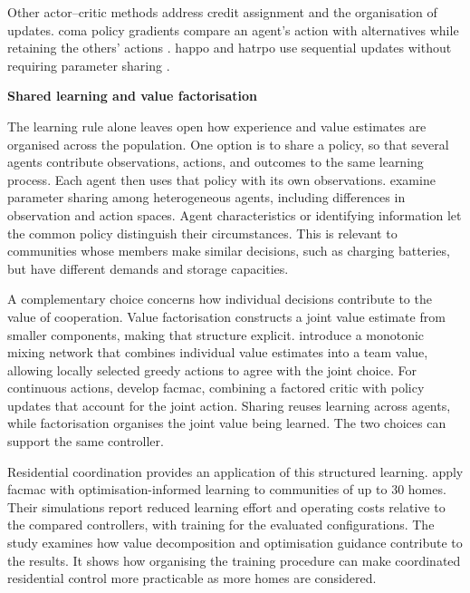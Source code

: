 Other actor--critic methods address credit assignment and the organisation of updates. \gls{coma} policy gradients compare an agent's action with alternatives while retaining the others' actions \parencite{foerster2018coma}. \gls{happo} and \gls{hatrpo} use sequential updates without requiring parameter sharing \parencite{kuba2022happo}.

\smallskip
\noindent\textbf{Shared learning and value factorisation}\par\nobreak\smallskip
The learning rule alone leaves open how experience and value estimates are organised across the population. One option is to share a policy, so that several agents contribute observations, actions, and outcomes to the same learning process. Each agent then uses that policy with its own observations. \textcite{terry2023sharing} examine parameter sharing among heterogeneous agents, including differences in observation and action spaces. Agent characteristics or identifying information let the common policy distinguish their circumstances. This is relevant to communities whose members make similar decisions, such as charging batteries, but have different demands and storage capacities.

A complementary choice concerns how individual decisions contribute to the value of cooperation. Value factorisation constructs a joint value estimate from smaller components, making that structure explicit. \textcite{rashid2018qmix} introduce a monotonic mixing network that combines individual value estimates into a team value, allowing locally selected greedy actions to agree with the joint choice. For continuous actions, \textcite{peng2021facmac} develop \gls{facmac}, combining a factored critic with policy updates that account for the joint action. Sharing reuses learning across agents, while factorisation organises the joint value being learned. The two choices can support the same controller.

Residential coordination provides an application of this structured learning. \textcite{charbonnier2025rehearsal} apply \gls{facmac} with optimisation-informed learning to communities of up to 30 homes. Their simulations report reduced learning effort and operating costs relative to the compared controllers, with training for the evaluated configurations. The study examines how value decomposition and optimisation guidance contribute to the results. It shows how organising the training procedure can make coordinated residential control more practicable as more homes are considered.

